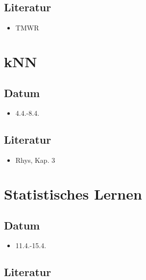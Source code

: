 \documentclass[
]{book}
\providecommand{\tightlist}{%
  \setlength{\itemsep}{0pt}\setlength{\parskip}{0pt}}
\begin{document}
\hypertarget{literatur-3}{%
\subsection{Literatur}\label{literatur-3}}

\begin{itemize}
\tightlist
\item
  TMWR
\end{itemize}

\hypertarget{knn}{%
\section{kNN}\label{knn}}

\hypertarget{datum-3}{%
\subsection{Datum}\label{datum-3}}

\begin{itemize}
\tightlist
\item
  4.4.-8.4.
\end{itemize}

\hypertarget{literatur-4}{%
\subsection{Literatur}\label{literatur-4}}

\begin{itemize}
\tightlist
\item
  Rhys, Kap. 3
\end{itemize}

\hypertarget{statistisches-lernen}{%
\section{Statistisches Lernen}\label{statistisches-lernen}}

\hypertarget{datum-4}{%
\subsection{Datum}\label{datum-4}}

\begin{itemize}
\tightlist
\item
  11.4.-15.4.
\end{itemize}

\hypertarget{literatur-5}{%
\subsection{Literatur}\label{literatur-5}}
\end{document}
